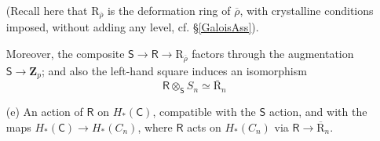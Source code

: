 \documentclass[10pt]{amsart}
\newcommand{\Z}{\mathbf{Z}}
\newcommand{\usbR}{\overline{\mathrm{R}}}
\newcommand{\defring}{\mathrm{R}_{\rhobar}}
\newcommand{\rhobar}{\overline{\rho}}
\newcommand{\Cinf}{\mathsf{C}}
\newcommand{\Sinf}{\mathsf{S}}
\newcommand{\Rinf}{\mathsf{R}}
\theoremstyle{remark}
\begin{document}
\begin{itemize}
(Recall here that $\defring$ is the deformation ring of $\rhobar$, with crystalline conditions imposed, without adding any level, 
cf. \S \ref{GaloisAss}). 

Moreover, the composite $\Sinf \rightarrow \Rinf \rightarrow \defring$ factors through 
the augmentation $\Sinf \rightarrow \Z_p$; and also the  left-hand square induces an isomorphism
 \begin{equation} \label{second-iso}  \Rinf \otimes_{\Sinf} S_n \simeq  \usbR_n \end{equation}
 
 
\item[(e)] An  action of $\Rinf$ on $H_*(\Cinf)$, compatible with the $\Sinf$ action,
and with the maps $H_*(\Cinf) \rightarrow H_*(C_n)$, where
$\Rinf$ acts on $H_*(C_n)$ via $\Rinf \rightarrow  \usbR_n$. 

 


\end{itemize}
\end{document}
